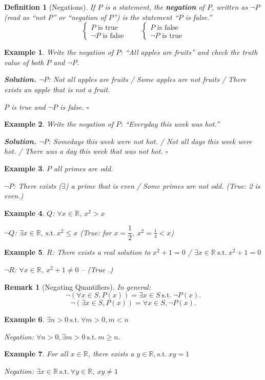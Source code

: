 \documentclass[12pt,a4paper]{article}
\newtheorem{df}{Definition}[subsection]
\newtheorem{eg}{Example}[subsection]
\newenvironment*{sol}{\par\indent\textbf{\textit{Solution. }}}{\hfill{$\square$}\par}
\newtheorem*{rmk}{\indent Remark}
\def\R{{\mathbb{R}}}
\def\st{\ \mathrm{s.t.}\ }
\begin{document}
\begin{df}[Negations]
	If $P$ is a statement, the \textbf{negation} of $P$, written as $\neg P$ (read as ``not $P$'' or ``negation of $P$'') is the statement ``$P$ is false.''	
	\[\begin{cases}P\text{ is true}\\\neg P\text{ is false}\end{cases}\qquad\begin{cases}P\text{ is false}\\\neg P\text{ is true}\end{cases}\]
\end{df}
\begin{eg}
	Write the negation of $P$: ``All apples are fruits'' and check the truth value of both $P$ and $\neg P$.
	\begin{sol}
		$\neg P$: Not all apples are fruits / Some apples are not fruits / There exists an apple that is not a fruit.
		
		$P$ is true and $\neg P$ is false. 
	\end{sol}
\end{eg}
\begin{eg}
	Write the negation of $P$: ``Everyday this week was hot.''
	\begin{sol}
		$\neg P$: Somedays this week were not hot. / Not all days this week were hot. / There was a day this week that was not hot. 
	\end{sol}
\end{eg}
\begin{eg}
	$P$ all primes are odd.
	
	$\neg P$: There exists ($\exists$) a prime that is even / Some primes are not odd. (True: 2 is even.)
\end{eg}
\begin{eg}
	$Q$: $\forall x\in\R,\ x^2>x$
	
	$\neg Q$: $\exists x\in\R,\st x^2\leq x$ (True: for $x=\dfrac{1}{2},\ x^2=\frac{1}{4}<x$)	
\end{eg}
\begin{eg}
	$R$: There exists a real solution to $x^2+1=0$ / $\exists x\in\R\st x^2+1=0$
	
	$\neg R$: $\forall x\in\R,\ x^2+1\neq0$ -- (True	.)
\end{eg}
\begin{rmk}[Negating Quantifiers]
	In general: 
	\[\neg(\forall x\in S, P(x))=\exists x\in S\st\neg P(x). \]
	\[\neg(\exists x\in S, P(x))=\forall x\in S, \neg P(x). \]	
\end{rmk}
\begin{eg}
	$\exists n>0\st\forall m>0, m<n$
	
	Negation: $\forall n>0, \exists m>0\st m\geq n.$	
\end{eg}
\begin{eg}
	For all $x\in\R$, there exists a $y\in\R$,$\st xy=1$
	
	Negation: $\exists x\in\R\st\forall y\in\R,\ xy\neq1$	
\end{eg}
\end{document}
